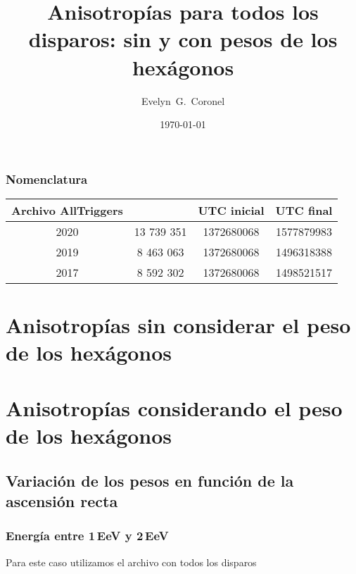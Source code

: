 



\title{Anisotropías para todos los disparos: sin y con pesos de los hexágonos}
\author{Evelyn~G.~Coronel}


\date[]{\lowercase{\today}} %


\maketitle

\subsubsection{Nomenclatura}

			\begin{table}[H]
			\centering
				\begin{tabular}{c|c|c|c}
			Archivo AllTriggers  & \text{Eventos} & UTC inicial &  UTC final  \\ \hline
				2020			 & 13 739 351	  &  1372680068	&  1577879983 \\ %
				2019			 & 	8 463 063	  &	 1372680068 &  1496318388 \\ %
				2017			 &	8 592 302	  &  1372680068 &  1498521517 \\ %
					\end{tabular}
			\end{table}



\section{Anisotropías sin considerar el peso de los hexágonos}


\section{Anisotropías  considerando el peso de los hexágonos}

\subsection{Variación de los pesos en función de la ascensión recta}

\subsubsection{Energía entre 1\,EeV y 2\,EeV}

Para este caso utilizamos el archivo con todos los disparos



